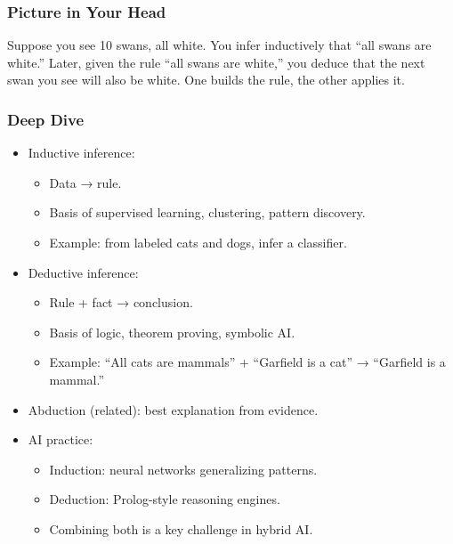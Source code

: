 \documentclass[
  letterpaper,
  DIV=11,
  numbers=noendperiod]{scrreprt}
\providecommand{\tightlist}{%
  \setlength{\itemsep}{0pt}\setlength{\parskip}{0pt}}
\begin{document}
\subsubsection{Picture in Your Head}\label{picture-in-your-head-51}

Suppose you see 10 swans, all white. You infer inductively that ``all
swans are white.'' Later, given the rule ``all swans are white,'' you
deduce that the next swan you see will also be white. One builds the
rule, the other applies it.

\subsubsection{Deep Dive}\label{deep-dive-51}

\begin{itemize}
\item
  Inductive inference:

  \begin{itemize}
  \tightlist
  \item
    Data → rule.
  \item
    Basis of supervised learning, clustering, pattern discovery.
  \item
    Example: from labeled cats and dogs, infer a classifier.
  \end{itemize}
\item
  Deductive inference:

  \begin{itemize}
  \tightlist
  \item
    Rule + fact → conclusion.
  \item
    Basis of logic, theorem proving, symbolic AI.
  \item
    Example: ``All cats are mammals'' + ``Garfield is a cat'' →
    ``Garfield is a mammal.''
  \end{itemize}
\item
  Abduction (related): best explanation from evidence.
\item
  AI practice:

  \begin{itemize}
  \tightlist
  \item
    Induction: neural networks generalizing patterns.
  \item
    Deduction: Prolog-style reasoning engines.
  \item
    Combining both is a key challenge in hybrid AI.
  \end{itemize}
\end{itemize}
\end{document}
